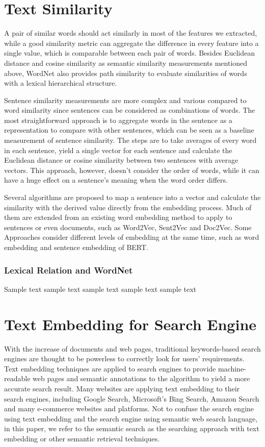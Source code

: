 \section{Text Similarity}
A pair of similar words should act similarly in most of the features we extracted, while a good similarity metric can aggregate the difference in every feature into a single value, which is comparable between each pair of words.
Besides Euclidean distance and cosine similarity as semantic similarity measurements mentioned above, WordNet also provides path similarity to evaluate similarities of words with a lexical hierarchical structure.

Sentence similarity measurements are more complex and various compared to word similarity since sentences can be considered as combinations of words.
The most straightforward approach is to aggregate words in the sentence as a representation to compare with other sentences, which can be seen as a baseline measurement of sentence similarity.
The steps are to take averages of every word in each sentence, yield a single vector for each sentence and calculate the Euclidean distance or cosine similarity between two sentences with average vectors.
This approach, however, doesn't consider the order of words, while it can have a huge effect on a sentence's meaning when the word order differs.

Several algorithms are proposed to map a sentence into a vector and calculate the similarity with the derived value directly from the embedding process.
Much of them are extended from an existing word embedding method to apply to sentences or even documents, such as Word2Vec, Sent2Vec and Doc2Vec.
Some Approaches consider different levels of embedding at the same time, such as word embedding and sentence embedding of BERT.

\subsubsection{Lexical Relation and WordNet}
Sample text sample text sample text sample text sample text


\section{Text Embedding for Search Engine}
With the increase of documents and web pages, traditional keywords-based search engines are thought to be powerless to correctly look for users' requirements.
Text embedding techniques are applied to search engines to provide machine-readable web pages and semantic annotations to the algorithm to yield a more accurate search result.
Many websites are applying text embedding to their search engines, including Google Search, Microsoft's Bing Search, Amazon Search and many e-commerce websites and platforms.
Not to confuse the search engine using text embedding and the search engine using semantic web search language, in this paper, we refer to the semantic search as the searching approach with text embedding or other semantic retrieval techniques. 

